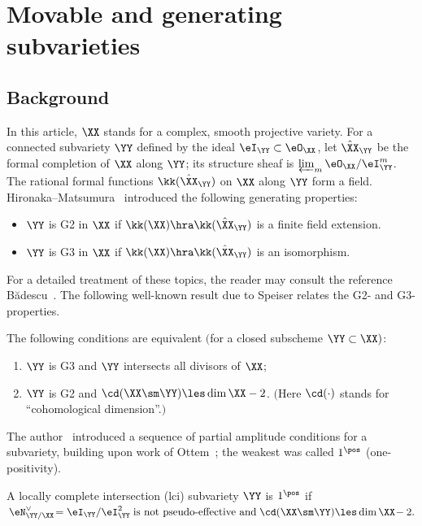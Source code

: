 \section{Movable and generating subvarieties}\label{sct:gen-fam}

\subsection{Background}\label{ssct:setup}

In this article, $\XX$ stands for a complex, smooth projective variety. For a connected subvariety $\YY$ defined by the ideal $\eI_\YY\subset\eO_\XX$, let $\hat \XX_\YY$ be the formal completion of $\XX$ along $\YY$; its structure sheaf is ${\varprojlim}_m\,\eO_\XX/\eI_\YY^{m}$. The rational formal functions $\kk(\hat \XX_\YY)$ on $\XX$ along $\YY$ form a field. 
Hironaka--Matsumura~\cite{hir-mat} introduced the following generating properties: 
\begin{itemize}
\item $\YY$ is G2 in $\XX$ if $\kk(\XX)\hra \kk(\hat \XX_\YY)$ is a finite field extension. 
\item $\YY$ is G3 in $\XX$ if $\kk(\XX)\hra \kk(\hat \XX_\YY)$ is an isomorphism.
\end{itemize}
For a detailed treatment of these topics, the reader may consult the reference B\u{a}descu~\cite{bad}. The following well-known result due to Speiser relates the G2- and G3-properties.

\begin{thm-nono}
The following conditions are equivalent $($for a closed subscheme $\YY\subset\XX)$: 
\begin{enumerate}
\item $\YY$ is G3 and $\YY$ intersects all divisors of $\XX$;
\item $\YY$ is G2 and $\cd(\XX\sm \YY)\les\dim\XX-2$. 
$($Here $\cd(\cdot)$ stands for ``cohomological dimension''.$)$
\end{enumerate}
\end{thm-nono}

The author~\cite{hlc-pas} introduced a sequence of partial amplitude conditions for a subvariety, building upon work of Ottem~\cite{ottm}; the weakest was called $1^\pos$ (one-positivity). 

\begin{m-definition}
A locally complete intersection (lci) subvariety $\YY$ is $1^\pos$ if $\,\eN_{\YY/\XX}^\vee\!=\eI_\YY/\eI_\YY^2\;\text{is not pseudo-effective and}\;\cd(\XX\sm\YY)\les\dim\XX\!-2.$
\end{m-definition}

